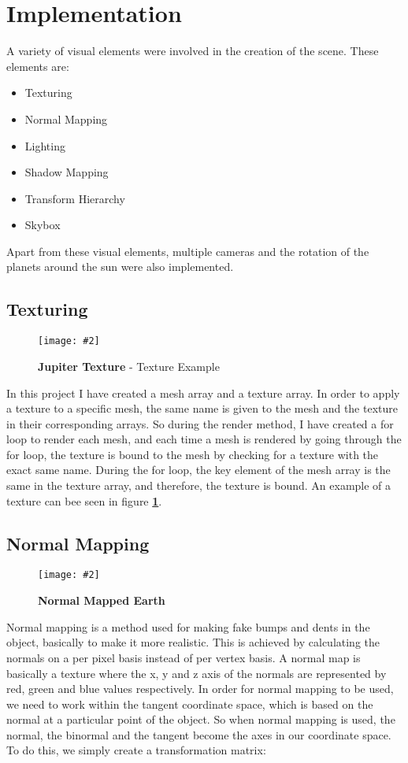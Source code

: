 \documentclass[10pt, a4paper]{article}
\newcommand{\figuremacro}[5]{
    \begin{figure}[#1]
        \centering
        \texttt{[image: \#2]}
        \caption[#3]{\textbf{#3}#4}
        \label{fig:#2}
    \end{figure}
}
\begin{document}
\section{Implementation}
	A variety of visual elements were involved in the creation of the scene. These elements are:
	\begin{itemize}
		\item Texturing
		\item Normal Mapping
		\item Lighting
		\item Shadow Mapping
		\item Transform Hierarchy
		\item Skybox
	\end{itemize}
	Apart from these visual elements, multiple cameras and the rotation of the planets around the sun were also implemented.
\newpage
\subsection{Texturing}

	\figuremacro{H}{Jupiter}{Jupiter Texture}{ - Texture Example}{1.0}

	In this project I have created a mesh array and a texture array. In order to apply a texture to a specific mesh, the same name is given to the mesh and the texture in their corresponding arrays. So during the render method, I have created a for loop to render each mesh, and each time a mesh is rendered by going through the for loop, the texture is bound to the mesh by checking for a texture with the exact same name. During the for loop, the key element of the mesh array is the same in the texture array, and therefore, the texture is bound. An example of a texture can bee seen in figure \textbf{\ref{fig:Jupiter}}.


\subsection{Normal Mapping}
		
	\figuremacro{H}{Earth}{Normal Mapped Earth}{ }{1.0}
	
	Normal mapping is a method used for making fake bumps and dents in the object, basically to make it more realistic. This is achieved by calculating the normals on a per pixel basis instead of per vertex basis. A normal map is basically a texture  where the x, y and z axis of the normals are represented by red, green and blue values respectively. In order for normal mapping to be used, we need to work within the tangent coordinate space, which is based on the normal at a particular point of the object. So when normal mapping is used, the normal, the binormal and the tangent become the axes in our coordinate space. To do this, we simply create a transformation matrix:
	
\end{document}
